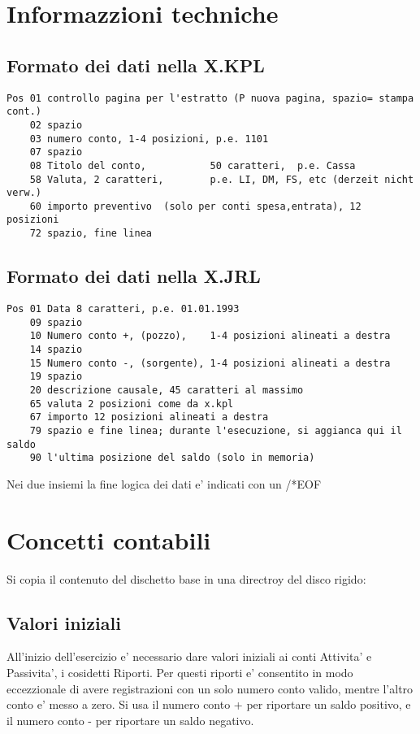 \documentclass[12pt]{report}
\begin{document}
\begin{appendix}
\chapter{Informazzioni techniche}

\section{ Formato dei dati nella X.KPL}


\begin{verbatim}
Pos 01 controllo pagina per l'estratto (P nuova pagina, spazio= stampa cont.)
    02 spazio
    03 numero conto, 1-4 posizioni, p.e. 1101 
    07 spazio
    08 Titolo del conto,           50 caratteri,  p.e. Cassa
    58 Valuta, 2 caratteri,        p.e. LI, DM, FS, etc (derzeit nicht verw.)
    60 importo preventivo  (solo per conti spesa,entrata), 12 posizioni
    72 spazio, fine linea
\end{verbatim}

\section{ Formato dei dati nella X.JRL}

\begin{verbatim}
Pos 01 Data 8 caratteri, p.e. 01.01.1993
    09 spazio 
    10 Numero conto +, (pozzo),    1-4 posizioni alineati a destra
    14 spazio
    15 Numero conto -, (sorgente), 1-4 posizioni alineati a destra
    19 spazio
    20 descrizione causale, 45 caratteri al massimo
    65 valuta 2 posizioni come da x.kpl
    67 importo 12 posizioni alineati a destra 
    79 spazio e fine linea; durante l'esecuzione, si aggianca qui il saldo
    90 l'ultima posizione del saldo (solo in memoria)
\end{verbatim}

Nei due insiemi la fine logica dei dati e' indicati con un /*EOF 

\chapter{Concetti contabili}

Si copia il contenuto del dischetto base in una directroy del disco rigido:

\section{Valori iniziali}
All'inizio dell'esercizio e' necessario dare valori iniziali ai conti 
Attivita' e Passivita', i cosidetti Riporti.
Per questi riporti e' consentito in modo eccezzionale di avere registrazioni
con un solo numero conto valido, mentre l'altro conto e' messo a zero.
Si usa il numero conto + per riportare un saldo positivo, e il numero conto -
per riportare un saldo negativo.


\end{appendix}
\end{document}
